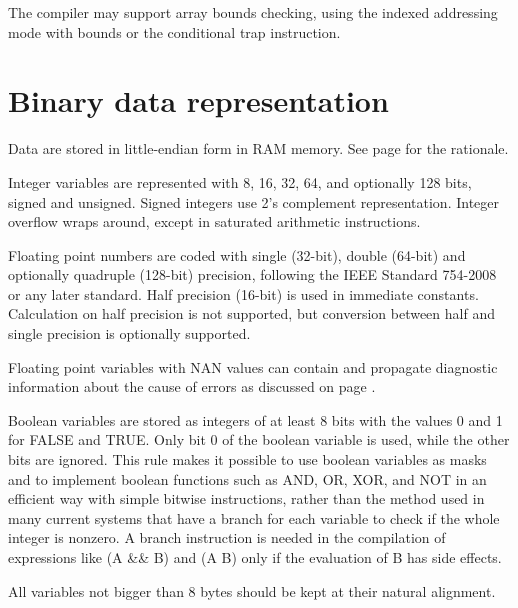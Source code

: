 \documentclass[forwardcom.tex]{subfiles}
\begin{document}
\vspace{2mm}
The compiler may support array bounds checking, using the indexed addressing mode with bounds or the conditional trap instruction. 

\section{Binary data representation} \label{binaryDataRepresentation}
Data are stored in little-endian form in RAM memory. See page \pageref{endianness} for the rationale. 
\vspace{2mm}

Integer variables are represented with 8, 16, 32, 64, and optionally 128 bits, signed and unsigned. Signed integers use 2's complement representation. Integer overflow wraps around, except in saturated arithmetic instructions. 
\vspace{2mm}

Floating point numbers are coded with single (32-bit), double (64-bit) and optionally quadruple (128-bit) precision, following the IEEE Standard 754-2008 or any later standard. Half precision (16-bit) is used in immediate constants. Calculation on half precision is not supported, but conversion between half and single precision is optionally supported. 
\vspace{2mm}

Floating point variables with NAN values can contain and propagate diagnostic information about the cause of errors as discussed on page \pageref{nanPropagation}. 
\vspace{2mm}

Boolean variables are stored as integers of at least 8 bits with the values 0 and 1 for FALSE and TRUE. Only bit 0 of the boolean variable is used, while the other bits are ignored. This rule makes it possible to use boolean variables as masks and to implement boolean functions such as AND, OR, XOR, and NOT in an efficient way with simple bitwise instructions, rather than the method used in many current systems that have a branch for each variable to check if the whole integer is nonzero. A branch instruction is needed in the compilation of expressions like (A \&\& B) and (A \textbar\textbar{} B) only if the evaluation of B has side effects. 
\vspace{2mm}

All variables not bigger than 8 bytes should be kept at their natural alignment.
\vspace{2mm}
\end{document}
